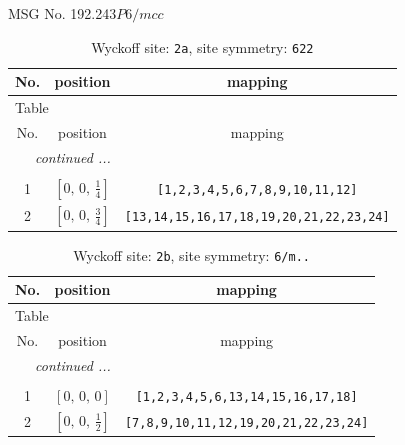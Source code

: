 \documentclass[fleqn,8pt]{jsarticle}
\begin{document}
\setcounter{MaxMatrixCols}{32}

\renewcommand{\tablename}{Table~}
\renewcommand{\figurename}{Figure~}
\begin{center}
\LARGE
MSG No. 192.243\quad$P6/mcc$
\end{center}
\renewcommand{\arraystretch}{1.2}
\begin{longtable}{ccc}
\caption{Wyckoff site: {\tt 2a}, site symmetry: {\tt 622}}
 \\
 \hline \hline
No. & position & mapping \\ \hline \endfirsthead

\multicolumn{2}{l}{\tablename\ \thetable{}} \\
 \hline \hline
No. & position & mapping \\ \hline \endhead

 \hline \hline
\multicolumn{2}{r}{\footnotesize\it continued ...} \\ \endfoot

 \hline \hline
\multicolumn{2}{r}{} \\ \endlastfoot

1 & $\left[ 0,\, 0,\, \frac{1}{4} \right]$ & {\tt [1,2,3,4,5,6,7,8,9,10,11,12]} \\ \hline
2 & $\left[ 0,\, 0,\, \frac{3}{4} \right]$ & {\tt [13,14,15,16,17,18,19,20,21,22,23,24]} \\
\end{longtable}
\renewcommand{\arraystretch}{1.2}
\begin{longtable}{ccc}
\caption{Wyckoff site: {\tt 2b}, site symmetry: {\tt 6/m..}}
 \\
 \hline \hline
No. & position & mapping \\ \hline \endfirsthead

\multicolumn{2}{l}{\tablename\ \thetable{}} \\
 \hline \hline
No. & position & mapping \\ \hline \endhead

 \hline \hline
\multicolumn{2}{r}{\footnotesize\it continued ...} \\ \endfoot

 \hline \hline
\multicolumn{2}{r}{} \\ \endlastfoot

1 & $\left[ 0,\, 0,\, 0 \right]$ & {\tt [1,2,3,4,5,6,13,14,15,16,17,18]} \\ \hline
2 & $\left[ 0,\, 0,\, \frac{1}{2} \right]$ & {\tt [7,8,9,10,11,12,19,20,21,22,23,24]} \\
\end{longtable}
\end{document}
